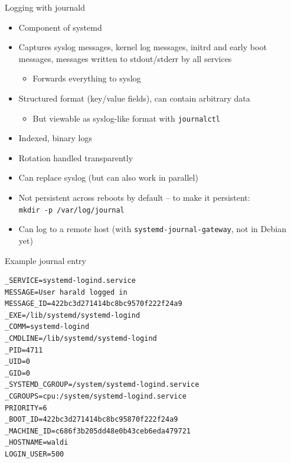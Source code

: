 \documentclass[11pt,final,usepdftitle=false]{beamer}
\begin{document}
\begin{frame}{Logging with journald}
\begin{itemize}
\item Component of systemd
\hbr
\item Captures syslog messages, kernel log messages, initrd and early boot messages, messages written to stdout/stderr by all services
	\begin{itemize}
		\item \alert{Forwards everything to syslog}
	\end{itemize}
\hbr
\item \alert{Structured format} (key/value fields), can contain \alert{arbitrary data}
\begin{itemize}
	\item But viewable as syslog-like format with \alert{\texttt{journalctl}}
\end{itemize}
\hbr
\item Indexed, binary logs
\hbr
\item Rotation handled transparently
\hbr
\item Can replace syslog (but can also work in parallel)
\hbr
\item Not persistent across reboots by default -- to make it persistent:\\
	\texttt{mkdir -p /var/log/journal}
\hbr
\item Can log to a remote host (with \texttt{systemd-journal-gateway}, not in Debian yet)
\end{itemize}
\end{frame}

\begin{frame}[fragile]{Example journal entry}
\begin{lstlisting}[basicstyle=\ttfamily\small]
_SERVICE=systemd-logind.service
MESSAGE=User harald logged in
MESSAGE_ID=422bc3d271414bc8bc9570f222f24a9
_EXE=/lib/systemd/systemd-logind
_COMM=systemd-logind
_CMDLINE=/lib/systemd/systemd-logind
_PID=4711
_UID=0
_GID=0
_SYSTEMD_CGROUP=/system/systemd-logind.service
_CGROUPS=cpu:/system/systemd-logind.service
PRIORITY=6
_BOOT_ID=422bc3d271414bc8bc95870f222f24a9
_MACHINE_ID=c686f3b205dd48e0b43ceb6eda479721
_HOSTNAME=waldi
LOGIN_USER=500
\end{lstlisting}
\end{frame}
\end{document}

